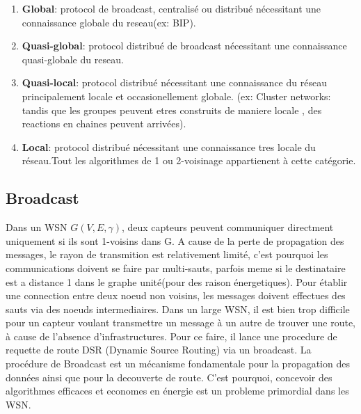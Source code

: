 \begin{enumerate}
 \item \textbf{Global}:         protocol de broadcast, centralisé ou distribué nécessitant une connaissance globale du reseau(ex: BIP).
 \item \textbf{Quasi-global}:   protocol distribué de broadcast nécessitant une connaissance quasi-globale du reseau.
 \item \textbf{Quasi-local}:    protocol distribué nécessitant une connaissance du réseau principalement locale et occasionellement globale.
(ex: Cluster networks: tandis que les groupes peuvent etres construits de maniere locale , des reactions en chaines peuvent arrivées).
 \item \textbf{Local}: 		protocol distribué nécessitant une connaissance tres locale du réseau.Tout les algorithmes de 1 ou 2-voisinage appartienent à cette catégorie.
\end{enumerate}


\subsection{Broadcast}

Dans un WSN $G(V,E,\gamma)$, deux capteurs peuvent communiquer directment uniquement si ils sont 1-voisins dans G.
A cause de la perte de propagation des messages, le rayon de transmition est relativement limité, c'est pourquoi les communications doivent se faire par multi-sauts, parfois meme si le destinataire est a distance 1 dans le graphe 
unité(pour des raison énergetiques). Pour établir une connection entre deux noeud non voisins, les messages doivent effectues des sauts via des noeuds intermediaires. Dans un large WSN, il est bien trop difficile pour un capteur voulant
transmettre un message à un autre de trouver une route, à cause de l'absence d'infrastructures. Pour ce faire, il lance une procedure de requette de route DSR (Dynamic Source Routing) via un broadcast.
La procédure de Broadcast est un mécanisme fondamentale pour la propagation des données ainsi que pour la decouverte de route. C'est pourquoi, concevoir des algorithmes efficaces et economes en énergie est un probleme primordial 
dans les WSN. 





